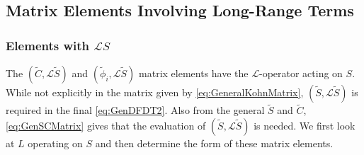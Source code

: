 \documentclass[Dissertation.tex]{subfiles}
\begin{document}
%
%
%

\subsection{Matrix Elements Involving Long-Range Terms}
\label{sec:MatrixLong}

\subsubsection{Elements with \texorpdfstring{$\mathcal{L}S$}{LS}}
\label{sec:LSElements}
The $(\tilde{C},\mathcal{L}\tilde{S})$ and $(\tilde{\phi}_i,\mathcal{L}\tilde{S})$ matrix elements have the $\mathcal{L}$-operator acting on $S$. While not explicitly in the matrix given by \cref{eq:GeneralKohnMatrix}, $(\tilde{S},\mathcal{L}\tilde{S})$ is required in the final \cref{eq:GenDFDT2}. Also from the general $\tilde{S}$ and $\tilde{C}$, \cref{eq:GenSCMatrix} gives that the evaluation of $(\tilde{S},\mathcal{L}\tilde{S})$ is needed. We first look at $L$ operating on $S$ and then determine the form of these matrix elements.
\end{document}
